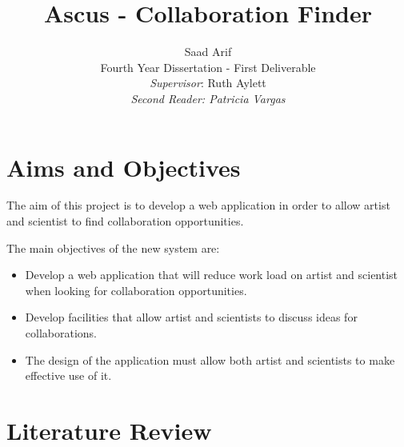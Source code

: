 \documentclass[a4paper,oneside,11pt]{report}
\begin{document}
\title{Ascus - Collaboration Finder}
\author{Saad Arif\\Fourth Year Dissertation - First Deliverable \\ \emph{Supervisor}: Ruth Aylett \\ \em \emph{Second Reader}: Patricia Vargas}
\maketitle
\pagestyle{empty} %
\tableofcontents %
\cleardoublepage %
\pagestyle{plain} %
\setcounter{page}{1} %

\chapter{Aims and Objectives}

The aim of this project is to develop a web application in order to allow artist and scientist to find collaboration opportunities.

The main objectives of the new system are:
\begin{itemize}
	\item Develop a web application that will reduce work load on artist and scientist when looking for collaboration opportunities.
	\item Develop facilities that allow artist and scientists to discuss ideas for collaborations.
	\item The design of the application must allow both artist and scientists to make effective use of it.
\end{itemize}
	
\chapter{Literature Review}
\end{document}
